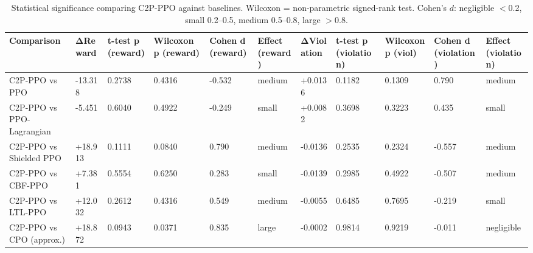 \begin{table}
\caption{Statistical significance comparing C2P-PPO against baselines. Wilcoxon = non-parametric signed-rank test. Cohen's $d$: negligible $<$0.2, small 0.2--0.5, medium 0.5--0.8, large $>$0.8.}
\label{tab:significance}
\begin{tabular}{lllllllllll}
\toprule
Comparison & ΔReward & t-test p (reward) & Wilcoxon p (reward) & Cohen d (reward) & Effect (reward) & ΔViolation & t-test p (violation) & Wilcoxon p (viol) & Cohen d (violation) & Effect (violation) \\
\midrule
C2P-PPO vs PPO & -13.318 & 0.2738 & 0.4316 & -0.532 & medium & +0.0136 & 0.1182 & 0.1309 & 0.790 & medium \\
C2P-PPO vs PPO-Lagrangian & -5.451 & 0.6040 & 0.4922 & -0.249 & small & +0.0082 & 0.3698 & 0.3223 & 0.435 & small \\
C2P-PPO vs Shielded PPO & +18.913 & 0.1111 & 0.0840 & 0.790 & medium & -0.0136 & 0.2535 & 0.2324 & -0.557 & medium \\
C2P-PPO vs CBF-PPO & +7.381 & 0.5554 & 0.6250 & 0.283 & small & -0.0139 & 0.2985 & 0.4922 & -0.507 & medium \\
C2P-PPO vs LTL-PPO & +12.032 & 0.2612 & 0.4316 & 0.549 & medium & -0.0055 & 0.6485 & 0.7695 & -0.219 & small \\
C2P-PPO vs CPO (approx.) & +18.872 & 0.0943 & 0.0371 & 0.835 & large & -0.0002 & 0.9814 & 0.9219 & -0.011 & negligible \\
\bottomrule
\end{tabular}
\end{table}
